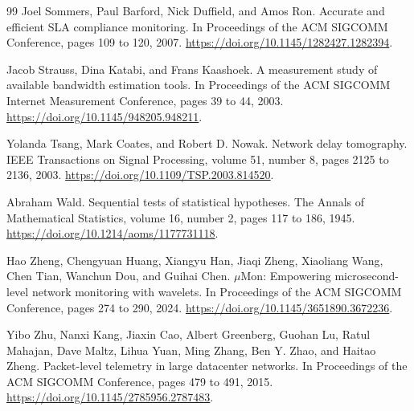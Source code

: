 \documentclass[a4paper,11pt]{report}
\begin{document}
\begin{thebibliography}{99}
Joel Sommers, Paul Barford, Nick Duffield, and Amos Ron.
\newblock Accurate and efficient SLA compliance monitoring.
\newblock In Proceedings of the ACM SIGCOMM Conference, pages 109 to 120, 2007.
\newblock \url{https://doi.org/10.1145/1282427.1282394}.

Jacob Strauss, Dina Katabi, and Frans Kaashoek.
\newblock A measurement study of available bandwidth estimation tools.
\newblock In Proceedings of the ACM SIGCOMM Internet Measurement Conference, pages 39 to 44, 2003.
\newblock \url{https://doi.org/10.1145/948205.948211}.

Yolanda Tsang, Mark Coates, and Robert D. Nowak.
\newblock Network delay tomography.
\newblock IEEE Transactions on Signal Processing, volume 51, number 8, pages 2125 to 2136, 2003.
\newblock \url{https://doi.org/10.1109/TSP.2003.814520}.

Abraham Wald.
\newblock Sequential tests of statistical hypotheses.
\newblock The Annals of Mathematical Statistics, volume 16, number 2, pages 117 to 186, 1945.
\newblock \url{https://doi.org/10.1214/aoms/1177731118}.

Hao Zheng, Chengyuan Huang, Xiangyu Han, Jiaqi Zheng, Xiaoliang Wang, Chen Tian, Wanchun Dou, and Guihai Chen.
\newblock \(\mu\)Mon: Empowering microsecond-level network monitoring with wavelets.
\newblock In Proceedings of the ACM SIGCOMM Conference, pages 274 to 290, 2024.
\newblock \url{https://doi.org/10.1145/3651890.3672236}.

Yibo Zhu, Nanxi Kang, Jiaxin Cao, Albert Greenberg, Guohan Lu, Ratul Mahajan, Dave Maltz, Lihua Yuan, Ming Zhang, Ben Y. Zhao, and Haitao Zheng.
\newblock Packet-level telemetry in large datacenter networks.
\newblock In Proceedings of the ACM SIGCOMM Conference, pages 479 to 491, 2015.
\newblock \url{https://doi.org/10.1145/2785956.2787483}.

\end{thebibliography}
\end{document}

